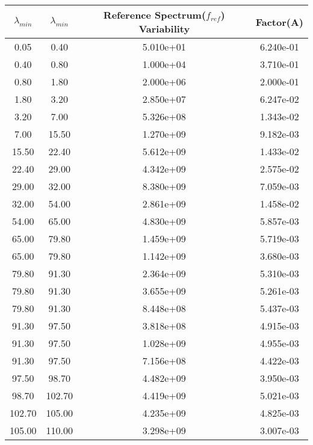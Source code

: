 %
\begin{table}[tb]
\begin{tabular}{|c |c|c|c|} \hline
$\lambda_{min}$  & $\lambda_{min}$    &  Reference Spectrum($f_{ref}$) Variability& Factor(A)
\\ \hline \hline
%
    0.05  &    0.40   &       5.010e+01     &       6.240e-01 \\
    0.40  &    0.80   &       1.000e+04     &       3.710e-01 \\
    0.80  &    1.80   &       2.000e+06     &       2.000e-01 \\
    1.80  &    3.20   &       2.850e+07     &       6.247e-02 \\
    3.20  &    7.00   &       5.326e+08     &       1.343e-02 \\
    7.00  &   15.50   &       1.270e+09     &       9.182e-03 \\
   15.50  &   22.40   &       5.612e+09     &       1.433e-02 \\
   22.40  &   29.00   &       4.342e+09     &       2.575e-02 \\
   29.00  &   32.00   &       8.380e+09     &       7.059e-03 \\
   32.00  &   54.00   &       2.861e+09     &       1.458e-02 \\
   54.00  &   65.00   &       4.830e+09     &       5.857e-03 \\
   65.00  &   79.80   &       1.459e+09     &       5.719e-03 \\
   65.00  &   79.80   &       1.142e+09     &       3.680e-03 \\
   79.80  &   91.30   &       2.364e+09     &       5.310e-03 \\
   79.80  &   91.30   &       3.655e+09     &       5.261e-03 \\
   79.80  &   91.30   &       8.448e+08     &       5.437e-03 \\
   91.30  &   97.50   &       3.818e+08     &       4.915e-03 \\
   91.30  &   97.50   &       1.028e+09     &       4.955e-03 \\
   91.30  &   97.50   &       7.156e+08     &       4.422e-03 \\
   97.50  &   98.70   &       4.482e+09     &       3.950e-03 \\
   98.70  &  102.70   &       4.419e+09     &       5.021e-03 \\
  102.70  &  105.00   &       4.235e+09     &       4.825e-03 \\
  105.00  &  110.00   &       3.298e+09     &       3.007e-03 \\

\end{tabular}
\end{table}
